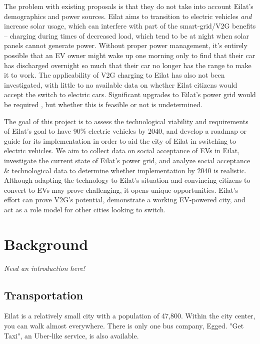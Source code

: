 \documentclass{report}                         %
\begin{document}
The problem with existing proposals is that they do not take into account Eilat's demographics and power sources. Eilat aims to transition to electric vehicles \textit{and} increase solar usage, which can interfere with part of the smart-grid/V2G benefits -- charging during times of decreased load, which tend to be at night when solar panels cannot generate power. Without proper power management, it's entirely possible that an EV owner might wake up one morning only to find that their car has discharged overnight so much that their car no longer has the range to make it to work. The applicability of V2G charging to Eilat has also not been investigated, with little to no available data on whether Eilat citizens would accept the switch to electric cars. Significant upgrades to Eilat's power grid would be required \cite{Vardimon2011AssessmentIsrael}, but whether this is feasible or not is undetermined. 

The goal of this project is to assess the technological viability and requirements of Eilat's goal to have 90\% electric vehicles by 2040, and develop a roadmap or guide for its implementation in order to aid the city of Eilat in switching to electric vehicles.
We aim to collect data on social acceptance of EVs in Eilat, investigate the current state of Eilat's power grid, and analyze social acceptance \& technological data to determine whether implementation by 2040 is realistic. Although adapting the technology to Eilat's situation and convincing citizens to convert to EVs may prove challenging, it opens unique opportunities. Eilat's effort can prove V2G's potential, demonstrate a working EV-powered city, and act as a role model for other cities looking to switch.

\newpage
\chapter{Background}
\textit{Need an introduction here!}

\section{Transportation}
Eilat is a relatively small city with a population of 47,800. Within the city center, you can walk almost everywhere. There is only one bus company, Egged. \cite{TransportationEilat} "Get Taxi", an Uber-like service, is also available. 
\end{document}
